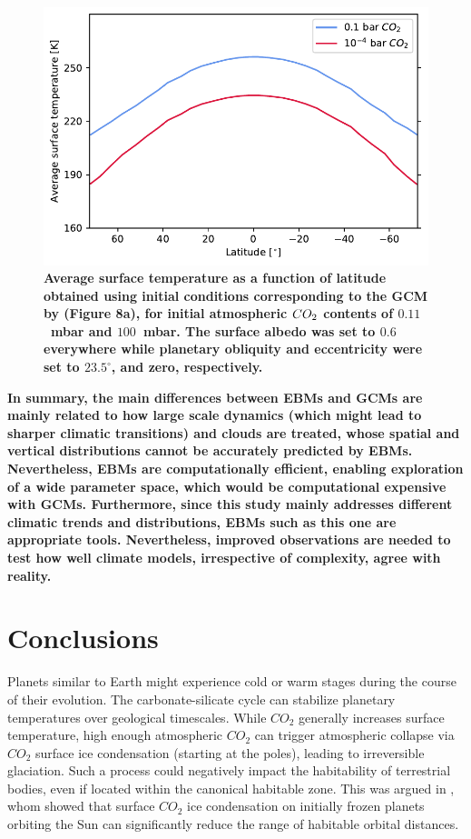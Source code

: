 \documentclass[fleqn,usenatbib]{mnras}
\providecommand{\DIFadd}[1]{{\bf #1}} %
\providecommand{\DIFaddend}{} %
\providecommand{\DIFaddFL}[1]{\DIFadd{#1}} %
\DeclareRobustCommand{\DIFaddend}{\DIFOaddend \let\includegraphics\DIFOincludegraphics} %
\begin{document}
\begin{figure}
	\includegraphics[width=\columnwidth]{Figures/Hoffman_comparison.pdf}
    \caption{\DIFaddFL{Average surface temperature as a function of latitude obtained using initial conditions corresponding to the GCM by \citet{hoffman_snowball_2017} (Figure 8a), for initial atmospheric $CO_{\rm 2}$ contents of $0.11$~mbar and $100$~mbar. The surface albedo was set to $0.6$ everywhere while planetary obliquity and eccentricity were set to $23.5^{\circ}$, and zero, respectively.}}
    \label{fig:Hoffman_comparison}
\end{figure}

\DIFadd{In summary, the main differences between EBMs and GCMs are mainly related to how large scale dynamics (which might lead to sharper climatic transitions) and clouds are treated, whose spatial and vertical distributions cannot be accurately predicted by EBMs. Nevertheless, EBMs are computationally efficient,  enabling exploration of a wide parameter space, which would be computational expensive with GCMs. Furthermore, since this study mainly addresses different climatic trends and distributions, EBMs such as this one are appropriate tools. 
Nevertheless, improved observations are needed to test how well climate models, irrespective of complexity, agree with reality.
}

\DIFaddend \section{Conclusions}
Planets similar to Earth might experience cold or warm stages during the course of their evolution. The carbonate-silicate cycle can stabilize planetary temperatures over geological timescales. While  $CO_{\mathrm{2}}$ generally increases surface temperature, high enough atmospheric $CO_{\mathrm{2}}$ can trigger atmospheric collapse via $CO_{\mathrm{2}}$ surface ice condensation (starting at the poles), leading to irreversible glaciation. Such a process could negatively impact the habitability of terrestrial bodies, even if located within the canonical habitable zone. This was argued in \citet{Turbet2017}, whom showed that surface $CO_{\mathrm{2}}$ ice condensation on initially frozen planets orbiting the Sun can significantly reduce the range of habitable orbital distances. 
\end{document}
